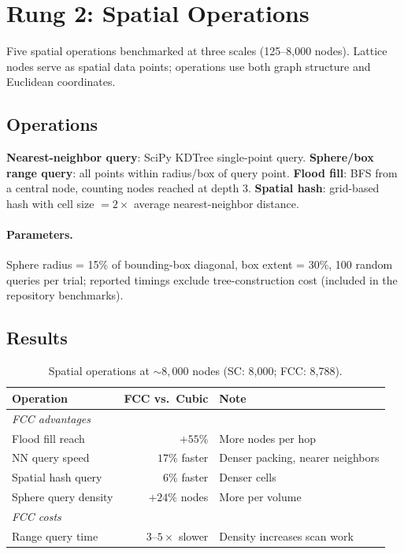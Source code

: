 \documentclass[11pt]{article}
\begin{document}
\section{Rung 2: Spatial Operations}
\label{sec:spatial}

Five spatial operations benchmarked at three scales (125--8{,}000
nodes). Lattice nodes serve as spatial data points; operations
use both graph structure and Euclidean coordinates.

\subsection{Operations}

\textbf{Nearest-neighbor query}: SciPy KDTree single-point query.
\textbf{Sphere/box range query}: all points within radius/box of
query point. \textbf{Flood fill}: BFS from a central node, counting
nodes reached at depth 3. \textbf{Spatial hash}: grid-based hash
with cell size $= 2 \times$ average nearest-neighbor distance.

\paragraph{Parameters.}
Sphere radius = 15\% of bounding-box diagonal, box extent = 30\%,
100 random queries per trial; reported timings exclude
tree-construction cost (included in the repository benchmarks).

\subsection{Results}

\begin{table}[H]
\centering
\caption{Spatial operations at ${\sim}8{,}000$ nodes
(SC: 8{,}000; FCC: 8{,}788).}
\label{tab:spatial}
\begin{tabular}{lrl}
\toprule
Operation & FCC vs.\ Cubic & Note \\
\midrule
\multicolumn{3}{l}{\textit{FCC advantages}} \\
Flood fill reach & $+55\%$ & More nodes per hop \\
NN query speed & $17\%$ faster & Denser packing, nearer neighbors \\
Spatial hash query & $6\%$ faster & Denser cells \\
Sphere query density & $+24\%$ nodes & More per volume \\
\midrule
\multicolumn{3}{l}{\textit{FCC costs}} \\
Range query time & $3$--$5\times$ slower & Density increases scan work \\
\bottomrule
\end{tabular}
\end{table}
\end{document}

